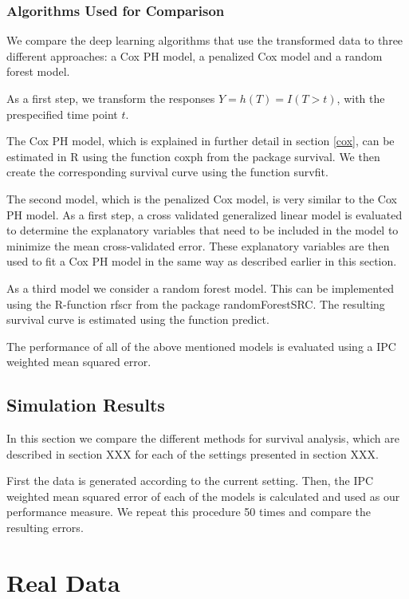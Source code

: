 \documentclass[12pt, a4paper]{article}
\theoremstyle{definition}
\theoremstyle{plain}
\numberwithin{equation}{section}
\numberwithin{figure}{section}
\numberwithin{table}{section}
\begin{document}
	\subsubsection{Algorithms Used for Comparison}
	
	We compare the deep learning algorithms that use the transformed data to three different approaches: a Cox PH model, a penalized Cox model and a random forest model.
	
	As a first step, we transform the responses $Y=h(T)=I(T>t)$, with the prespecified time point $t$.
	
	The Cox PH model, which is explained in further detail in section \ref{cox}, can be estimated in R using the function coxph from the package survival.
	We then create the corresponding survival curve using the function survfit.
	
	The second model, which is the penalized Cox model, is very similar to the Cox PH model.
	As a first step, a cross validated generalized linear model is evaluated to determine the explanatory variables that need to be included in the model to minimize the mean cross-validated error.
	These explanatory variables are then used to fit a Cox PH model in the same way as described earlier in this section.
	
	As a third model we consider a random forest model.
	This can be implemented using the R-function rfscr from the package randomForestSRC.
	The resulting survival curve is estimated using the function predict.
	
	The performance of all of the above mentioned models is evaluated using a IPC weighted mean squared error.
	
	\subsection{Simulation Results}
	In this section we compare the different methods for survival analysis, which are described in section XXX for each of the settings presented in section XXX.
	
	First the data is generated according to the current setting.
	Then, the IPC weighted mean squared error of each of the models is calculated and used as our performance measure.
	We repeat this procedure 50 times and compare the resulting errors.
	
	
	
	
	\newpage
	\section{Real Data}
	\newpage
\end{document}
